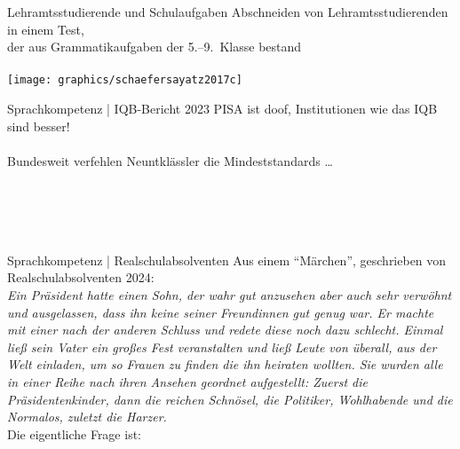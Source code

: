 \begin{frame}
  {Lehramtsstudierende und Schulaufgaben}
  \onslide<+->
  \onslide<+->
  Abschneiden von Lehramtsstudierenden in einem Test,\\
  der aus Grammatikaufgaben der 5.--9.~Klasse bestand\\
  \\
  \onslide<+->
  \centering 
  \texttt{[image: graphics/schaefersayatz2017c]}
\end{frame}

\begin{frame}
  {Sprachkompetenz | IQB-Bericht 2023}
  \onslide<+->
  \onslide<+->
  PISA ist doof, Institutionen wie das \alert{IQB} sind besser!\\
  \\
  \onslide<+->
  \Doppelzeile
  \centering
  Bundesweit verfehlen Neuntklässler die Mindeststandards \ldots\\
  \Halbzeile
  \onslide<+->
  \\
  \onslide<+->
  \Halbzeile
  \\
  \onslide<+->
  \Halbzeile
  \\
  \onslide<+->
  \Halbzeile
  \\
\end{frame}

\begin{frame}
  {Sprachkompetenz | Realschulabsolventen}
  \onslide<+->
  \onslide<+->
  Aus einem "`Märchen"', geschrieben von Realschulabsolventen 2024:\\
  \onslide<+->
  \Zeile
  \textit{Ein Präsident hatte einen Sohn, der wahr gut anzusehen aber auch sehr verwöhnt und ausgelassen, dass ihn keine seiner Freundinnen gut genug war. Er machte mit einer nach der anderen Schluss und redete diese noch dazu schlecht. Einmal ließ sein Vater ein großes Fest veranstalten und ließ Leute von überall, aus der Welt einladen, um so Frauen zu finden die ihn heiraten wollten. Sie wurden alle in einer Reihe nach ihren Ansehen geordnet aufgestellt: Zuerst die Präsidentenkinder, dann die reichen Schnösel, die Politiker, Wohlhabende und die Normalos, zuletzt die Harzer.}\\
  \onslide<+->
  \Zeile
  \centering 
  Die eigentliche Frage ist: 
\end{frame}

